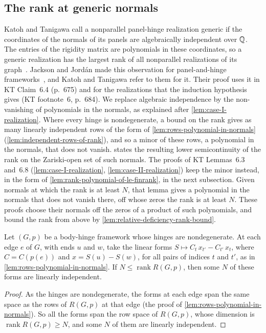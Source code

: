 \subsection{The rank at generic normals}
\label{sec:molecular-algebraic-induction-genericity}

Katoh and Tanigawa call a nonparallel panel-hinge realization generic if
the coordinates of the normals of its panels are algebraically
independent over ${\mathbb{Q}}$. The entries of the rigidity matrix are
polynomials in these coordinates, so a generic realization has the
largest rank of all nonparallel realizations of its
graph~\cite[\S5.1, p.~668]{katohTanigawa2011}. Jackson and Jord\'an made
this observation for panel-and-hinge
frameworks~\cite[\S7]{jacksonJordan2009}, and Katoh and Tanigawa refer to
them for it. Their proof uses it in KT Claim~6.4 (p.~675) and for the
realizations that the induction hypothesis gives (KT footnote~6,
p.~684). We replace
algebraic independence by the non-vanishing of polynomials in the
normals, as explained after \cref{lem:case-I-realization}. Where every
hinge is nondegenerate, a bound on the rank gives as many linearly
independent rows of the form of \cref{lem:rows-polynomial-in-normals}
(\cref{lem:independent-rows-of-rank}), and so a minor of these rows, a
polynomial in the normals, that does not vanish.
 states the resulting lower semicontinuity
of the rank on the Zariski-open set of such normals. The proofs of KT
Lemmas~6.3 and~6.8 (\cref{lem:case-I-realization},
\cref{lem:case-II-realization}) keep the minor instead, in the form of
\cref{lem:rank-polynomial-of-le-finrank}, in the next subsection. Given
normals at which the rank is at least $N$, that lemma
gives a polynomial in the normals that does not vanish there, off whose
zeros the rank is at least $N$. These proofs choose their normals off
the zeros of a product of such polynomials, and bound the rank from
above by \cref{lem:relative-deficiency-rank-bound}.

\begin{lemma}
  \label{lem:independent-rows-of-rank}
  \leanok
  Let $(G,p)$ be a body-hinge framework whose hinges are nondegenerate.
  At each edge $e$ of $G$, with ends $u$ and $w$, take the linear forms
  $S \mapsto C_t\, x_{t'} - C_{t'}\, x_t$, where $C = C(p(e))$ and
  $x = S(u) - S(w)$, for all pairs of indices $t$ and $t'$, as in
  \cref{lem:rows-polynomial-in-normals}. If
  $N \le \operatorname{rank} R(G,p)$, then some $N$ of these forms are
  linearly independent.
\end{lemma}
\begin{proof}
  \leanok
  As the hinges are nondegenerate, the forms at each edge span the same
  space as the rows of $R(G,p)$ at that edge (the proof of
  \cref{lem:rows-polynomial-in-normals}). So all the forms span the row
  space of $R(G,p)$, whose dimension is
  $\operatorname{rank} R(G,p) \ge N$, and some $N$ of them are linearly
  independent.
\end{proof}

